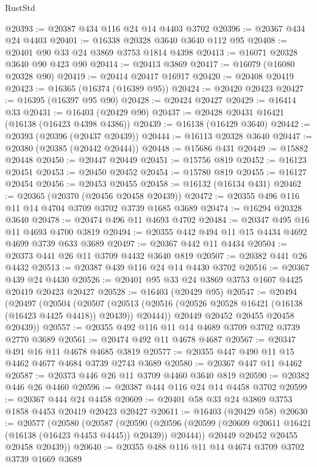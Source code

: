 \begin{lexlean}{RustStd}
\begin{coremodule}
@20393 := @20387 @434 @116 @24 @14 @4403 @3702
@20396 := @20367 @434 @24 @4403
@20401 := @16338 @20328 @3640 @3640 @112 @95
@20408 := @20401 @90 @33 @24 @3869 @3753 @1814 @4398
@20413 := @16071 @20328 @3640 @90 @423 @90
@20414 := @20413 @3869
@20417 := @16079 (@16080 @20328 @90)
@20419 := @20414 @20417 @16917
@20420 := @20408 @20419
@20423 := @16365 (@16374 (@16389 @95))
@20424 := @20420 @20423
@20427 := @16395 (@16397 @95 @90)
@20428 := @20424 @20427
@20429 := @16414 @33
@20431 := @16403 (@20429 @90)
@20437 := @20428 @20431 @16421 (@16138 (@16423 @4398 @4386))
@20439 := @16138 (@16429 @3640)
@20442 := @20393 (@20396 (@20437 @20439))
@20444 := @16113 @20328 @3640
@20447 := @20380 (@20385 (@20442 @20444))
@20448 := @15686 @431
@20449 := @15882 @20448
@20450 := @20447 @20449
@20451 := @15756 @819
@20452 := @16123 @20451
@20453 := @20450 @20452
@20454 := @15780 @819
@20455 := @16127 @20454
@20456 := @20453 @20455
@20458 := @16132 (@16134 @431)
@20462 := @20365 (@20370 (@20456 @20458 @20439))
@20472 := @20355 @496 @116 @11 @14 @4704 @3709 @3702 @3739 @1685 @3689
@20474 := @16294 @20328 @3640
@20478 := @20474 @496 @11 @4693 @4702
@20484 := @20347 @495 @16 @11 @4693 @4700 @3819
@20494 := @20355 @442 @494 @11 @15 @4434 @4692 @4699 @3739 @633 @3689
@20497 := @20367 @442 @11 @4434
@20504 := @20373 @441 @26 @11 @3709 @4432 @3640 @819
@20507 := @20382 @441 @26 @4432
@20513 := @20387 @439 @116 @24 @14 @4430 @3702
@20516 := @20367 @439 @24 @4430
@20526 := @20401 @95 @33 @24 @3869 @3753 @1607 @4425 @20419 @20423 @20427
@20528 := @16403 (@20429 @95)
@20547 := @20494
    (@20497
      (@20504
        (@20507
          (@20513 (@20516 (@20526 @20528 @16421 (@16138 (@16423 @4425 @4418)) @20439)) @20444))
        @20449
        @20452
        @20455
        @20458
        @20439))
@20557 := @20355 @492 @116 @11 @14 @4689 @3709 @3702 @3739 @2770 @3689
@20561 := @20474 @492 @11 @4678 @4687
@20567 := @20347 @491 @16 @11 @4678 @4685 @3819
@20577 := @20355 @447 @490 @11 @15 @4462 @4677 @4684 @3739 @2743 @3689
@20580 := @20367 @447 @11 @4462
@20587 := @20373 @446 @26 @11 @3709 @4460 @3640 @819
@20590 := @20382 @446 @26 @4460
@20596 := @20387 @444 @116 @24 @14 @4458 @3702
@20599 := @20367 @444 @24 @4458
@20609 := @20401 @58 @33 @24 @3869 @3753 @1858 @4453 @20419 @20423 @20427
@20611 := @16403 (@20429 @58)
@20630 := @20577
    (@20580
      (@20587
        (@20590
          (@20596 (@20599 (@20609 @20611 @16421 (@16138 (@16423 @4453 @4445)) @20439)) @20444))
        @20449
        @20452
        @20455
        @20458
        @20439))
@20640 := @20355 @488 @116 @11 @14 @4674 @3709 @3702 @3739 @1669 @3689

\end{coremodule}
\end{lexlean}
